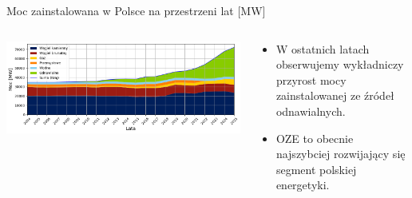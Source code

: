 \begin{frame}{Moc zainstalowana w Polsce na przestrzeni lat [MW]}
    \begin{columns}[T]
        \begin{column}{0.6\textwidth}
            \includegraphics[width=\textwidth]{images/powerOverYears.png}
        \end{column}
        
        \begin{column}{0.4\textwidth}
            \vspace{1cm} %
            \begin{itemize}
                \item[\faIcon{chart-line}]  W ostatnich latach obserwujemy wykładniczy przyrost mocy zainstalowanej ze źródeł odnawialnych.
                \item[\faIcon{wind}]  OZE to obecnie najszybciej rozwijający się segment polskiej energetyki.
            \end{itemize}
        \end{column}
    \end{columns}
\end{frame}

